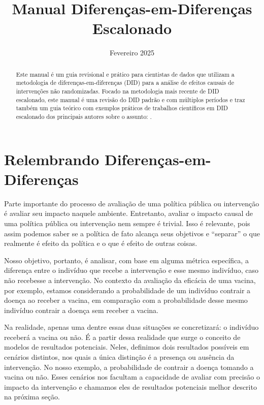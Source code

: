 \documentclass[portugues]{article}
\title{Manual Diferenças-em-Diferenças Escalonado}
\author{}
\date{Fevereiro 2025}
\begin{document}
\maketitle

\vspace{100mm}

\begin{abstract}
   Este manual é um guia revisional e prático para cientistas de dados que utilizam a metodologia de diferenças-em-diferenças (DID) para a análise de efeitos causais de intervenções não randomizadas. Focado na metodologia mais recente de DID escalonado, este manual é uma revisão do DID padrão e com múltiplos períodos e traz também um guia teórico com exemplos práticos de trabalhos científicos em DID escalonado dos principais autores sobre o assunto: \cite{goodman2021difference, sun2021estimating, callaway2021difference, borusyak2024revisiting}.
\end{abstract}

\newpage

\tableofcontents

\newpage

\section{Relembrando Diferenças-em-Diferenças}

Parte importante do processo de avaliação de uma política pública ou intervenção é avaliar seu impacto naquele ambiente. Entretanto, avaliar o impacto causal de uma política pública ou intervenção nem sempre é trivial. Isso é relevante, pois assim podemos saber se a política de fato alcança seus objetivos e ``separar'' o que realmente é efeito da política e o que é efeito de outras coisas. 

Nosso objetivo, portanto, é analisar, com base em alguma métrica específica, a diferença entre o indivíduo que recebe a intervenção e esse mesmo indivíduo, caso não recebesse a intervenção. No contexto da avaliação da eficácia de uma vacina, por exemplo, estamos considerando a probabilidade de um indivíduo contrair a doença ao receber a vacina, em comparação com a probabilidade desse mesmo indivíduo contrair a doença sem receber a vacina.

Na realidade, apenas uma dentre essas duas situações se concretizará: o indivíduo receberá a vacina ou não. É a partir dessa realidade que surge o conceito de modelos de resultados potenciais. Neles, definimos dois resultados possíveis em cenários distintos, nos quais a única distinção é a presença ou ausência da intervenção. No nosso exemplo, a probabilidade de contrair a doença tomando a vacina ou não. Esses cenários nos facultam a capacidade de avaliar com precisão o impacto da intervenção e chamamos eles de resultados potenciais melhor descrito na próxima seção.
\end{document}
